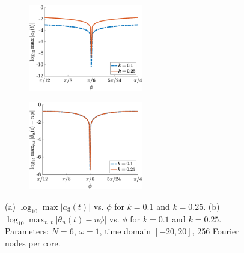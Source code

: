 \documentclass[11pt,reqno]{amsart}
\begin{document}
\begin{figure}
    \centering
    \begin{subfigure}{0.4\linewidth}
        \caption{}
        \label{fig:m6suppa3}
        \includegraphics[width=5cm]{a3phicont.eps}
    \end{subfigure}
    \begin{subfigure}{0.4\linewidth}
        \caption{}
        \label{fig:m6supptheta}
        \includegraphics[width=5cm]{thetaphicont.eps}
    \end{subfigure}
    \caption{(a) $\log_{10} \max |a_3(t)|$ vs. $\phi$ for $k=0.1$ and $k=0.25$. (b) $\log_{10} \max_{n,t}{|\theta_n(t) - n \phi|}$ vs. $\phi$ for $k=0.1$ and $k=0.25$. Parameters: $N=6$, $\omega=1$, time domain $[-20,20]$, 256 Fourier nodes per core.}
    \label{fig:m6supp}
\end{figure}
\end{document}
